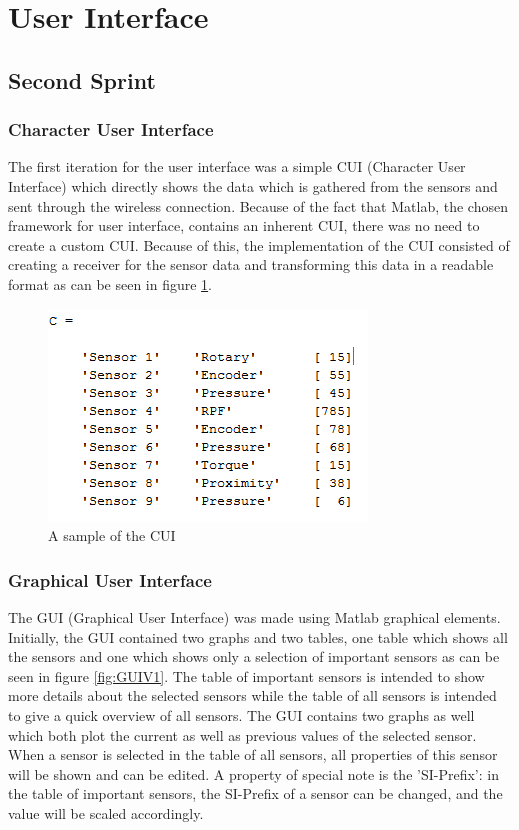 \section{User Interface}

\subsection{Second Sprint}

\subsubsection{Character User Interface}

The first iteration for the user interface was a simple CUI (Character User Interface) which directly shows the data which is gathered from the sensors and sent through the wireless connection. Because of the fact that Matlab, the chosen framework for user interface, contains an inherent CUI, there was no need to create a custom CUI. Because of this, the implementation of the CUI consisted of creating a receiver for the sensor data and transforming this data in a readable format as can be seen in figure \ref{fig:CUIV1}. 

\begin{figure}[H]
	\centering
	\includegraphics[width=.75\textwidth]{images/CUI}
	\caption{A sample of the CUI} 
	\label{fig:CUIV1}
\end{figure} 

\subsubsection{Graphical User Interface}

The GUI (Graphical User Interface) was made using Matlab graphical elements. Initially, the GUI contained two graphs and two tables, one table which shows all the sensors and one which shows only a selection of important sensors as can be seen in figure \ref{fig:GUIV1}.
The table of important sensors is intended to show more details about the selected sensors while the table of all sensors is intended to give a quick overview of all sensors. The GUI contains two graphs as well which both plot the current as well as previous values of the selected sensor. When a sensor is selected in the table of all sensors, all properties of this sensor will be shown and can be edited. A property of special note is the 'SI-Prefix': in the table of important sensors, the SI-Prefix of a sensor can be changed, and the value will be scaled accordingly. 

